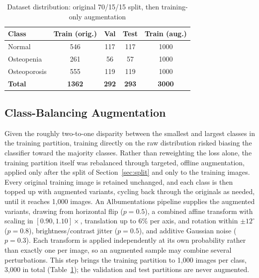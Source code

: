 \documentclass[journal]{IEEEtran}
\begin{document}
\begin{table}[!t]
\centering
\caption{Dataset distribution: original 70/15/15 split, then training-only
augmentation}
\label{tab:dataset_split}
\begin{tabular}{@{}l c c c c@{}}
\toprule
\textbf{Class} & \textbf{Train (orig.)} & \textbf{Val} & \textbf{Test} &
\textbf{Train (aug.)} \\
\midrule
Normal        & 546  & 117 & 117 & 1000 \\
Osteopenia    & 261  & 56  & 57  & 1000 \\
Osteoporosis  & 555  & 119 & 119 & 1000 \\
\midrule
\textbf{Total} & \textbf{1362} & \textbf{292} & \textbf{293} & \textbf{3000} \\
\bottomrule
\end{tabular}
\end{table}

\subsection{Class-Balancing Augmentation}
\label{sec:augmentation}
Given the roughly two-to-one disparity between the smallest and largest classes
in the training partition, training directly on the raw distribution risked
biasing the classifier toward the majority classes. Rather than reweighting the
loss alone, the training partition itself was rebalanced through targeted,
offline augmentation, applied only after the split of Section~\ref{sec:split}
and only to the training images. Every original training image is retained
unchanged, and each class is then topped up with augmented variants, cycling
back through the originals as needed, until it reaches 1,000 images. An
Albumentations \cite{buslaev2020albumentations} pipeline supplies the augmented
variants, drawing from horizontal flip ($p=0.5$), a combined affine transform
with scaling in $[0.90,1.10]\times$, translation up to $6\%$ per axis, and
rotation within $\pm12^{\circ}$ ($p=0.8$), brightness/contrast jitter
($p=0.5$), and additive Gaussian noise ($p=0.3$). Each transform is applied
independently at its own probability rather than exactly one per image, so an
augmented sample may combine several perturbations. This step brings the
training partition to 1,000 images per class, 3,000 in total
(Table~\ref{tab:dataset_split}); the validation and test partitions are never
augmented.
\end{document}
